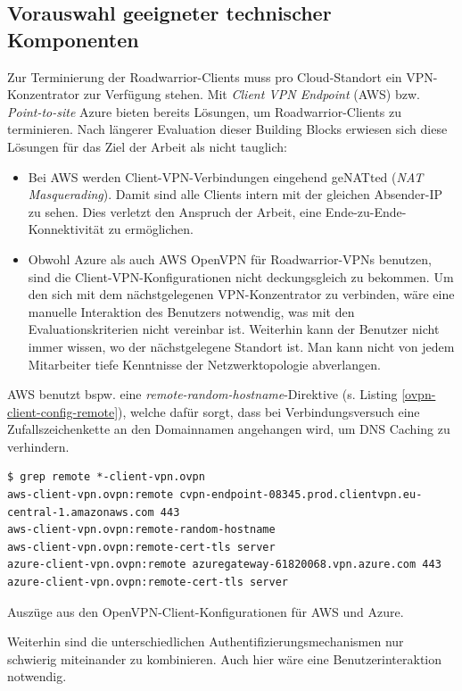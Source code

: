 \subsection{Vorauswahl geeigneter technischer Komponenten}\label{uc1-vorauswahl}
Zur Terminierung der Roadwarrior-Clients muss pro Cloud-Standort ein VPN-Konzentrator zur Verfügung stehen. Mit \textit{Client VPN Endpoint} (AWS) bzw. \textit{Point-to-site} Azure bieten bereits Lösungen, um Roadwarrior-Clients zu terminieren. Nach längerer Evaluation dieser Building Blocks erwiesen sich diese Lösungen für das Ziel der Arbeit als nicht tauglich:
\begin{itemize}
\item Bei AWS werden Client-VPN-Verbindungen eingehend geNATted (\textit{NAT Masquerading}). Damit sind alle Clients intern mit der gleichen Absender-IP zu sehen. Dies verletzt den Anspruch der Arbeit, eine Ende-zu-Ende-Konnektivität zu ermöglichen.
\item Obwohl Azure als auch AWS OpenVPN für Roadwarrior-VPNs benutzen, sind die Client-VPN-Konfigurationen nicht \glqq deckungsgleich\grqq{} zu bekommen. Um den sich mit dem nächstgelegenen VPN-Konzentrator zu verbinden, wäre eine manuelle Interaktion des Benutzers notwendig, was mit den Evaluationskriterien nicht vereinbar ist. Weiterhin kann der Benutzer nicht immer wissen, wo der nächstgelegene Standort ist. Man kann nicht von jedem Mitarbeiter tiefe Kenntnisse der Netzwerktopologie abverlangen.
\end{itemize}
AWS benutzt bspw. eine \textit{remote-random-hostname}-Direktive (s. Listing \ref{ovpn-client-config-remote}), welche dafür sorgt, dass bei Verbindungsversuch eine Zufallszeichenkette an den Domainnamen angehangen wird, um DNS Caching zu verhindern.
\begin{listing}[h]
\begin{verbatim}
$ grep remote *-client-vpn.ovpn
aws-client-vpn.ovpn:remote cvpn-endpoint-08345.prod.clientvpn.eu-central-1.amazonaws.com 443
aws-client-vpn.ovpn:remote-random-hostname
aws-client-vpn.ovpn:remote-cert-tls server
azure-client-vpn.ovpn:remote azuregateway-61820068.vpn.azure.com 443
azure-client-vpn.ovpn:remote-cert-tls server

\end{verbatim}
\caption{Auszüge aus den OpenVPN-Client-Konfigurationen für AWS und Azure.}
\label{ovpn-client-config-remote}
\end{listing}\FloatBarrier
Weiterhin sind die unterschiedlichen Authentifizierungsmechanismen nur schwierig miteinander zu kombinieren. Auch hier wäre eine Benutzerinteraktion notwendig.\\
